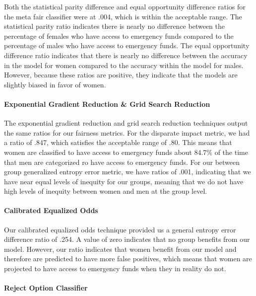 \documentclass[water,article,submit,moreauthors,pdftex]{mdpi}
\begin{document}
Both the statistical parity difference and equal opportunity difference
ratios for the meta fair classifier were at .004, which is within the
acceptable range. The statistical parity ratio indicates there is nearly
no difference between the percentage of females who have access to
emergency funds compared to the percentage of males who have access to
emergency funds. The equal opportunity difference ratio indicates that
there is nearly no difference between the accuracy in the model for
women compared to the accuracy within the model for males. However,
because these ratios are positive, they indicate that the models are
slightly biased in favor of women.

\hypertarget{exponential-gradient-reduction-grid-search-reduction}{%
\paragraph{Exponential Gradient Reduction \& Grid Search
Reduction}\label{exponential-gradient-reduction-grid-search-reduction}}

The exponential gradient reduction and grid search reduction techniques
output the same ratios for our fairness metrics. For the disparate
impact metric, we had a ratio of .847, which satisfies the acceptable
range of .80. This means that women are classified to have access to
emergency funds about 84.7\% of the time that men are categorized ro
have access to emergency funds. For our between group generalized
entropy error metric, we have ratios of .001, indicating that we have
near equal levels of inequity for our groups, meaning that we do not
have high levels of inequity between women and men at the group level.

\hypertarget{calibrated-equalized-odds}{%
\paragraph{Calibrated Equalized Odds}\label{calibrated-equalized-odds}}

Our calibrated equalized odds technique provided us a general entropy
error difference ratio of .254. A value of zero indicates that no group
benefits from our model. However, our ratio indicates that women benefit
from our model and therefore are predicted to have more false positives,
which means that women are projected to have access to emergency funds
when they in reality do not.

\hypertarget{reject-option-classifier}{%
\paragraph{Reject Option Classifier}\label{reject-option-classifier}}
\end{document}
